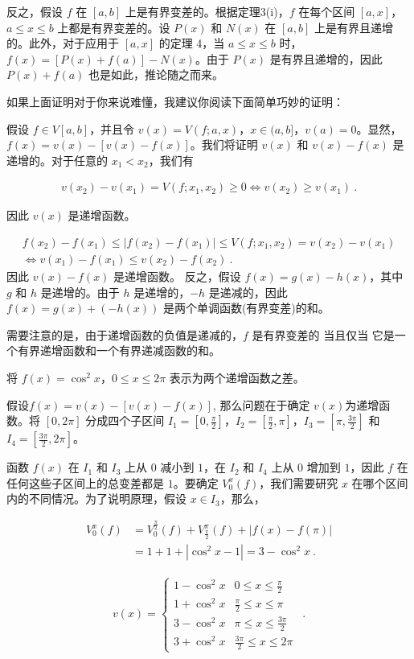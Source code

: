 反之，假设 $f$ 在 $[a,b]$ 上是有界变差的。根据定理3(i)，$f$ 在每个区间 $[a,x]$，$a\leq x\leq b$ 上都是有界变差的。设 $P(x)$ 和 $N(x)$ 在 $[a,b]$ 上是有界且递增的。此外，对于应用于 $[a,x]$ 的定理 4，当 $a\leq x\leq b$ 时，$f(x)=[P(x)+f(a)]-N(x)$。由于 $P(x)$ 是有界且递增的，因此 $P(x)+f(a)$ 也是如此，推论随之而来。

如果上面证明对于你来说难懂，我建议你阅读下面简单巧妙的证明：

假设 $f\in V[a,b]$，并且令 $v(x)=V(f;a,x)$，$x\in(a,b]$，$v(a)=0$。显然，$f(x)=v(x)-[v(x)-f(x)]$。我们将证明 $v(x)$ 和 $v(x)-f(x)$ 是递增的。对于任意的 $x_{1}<x_{2}$，我们有


\begin{align}
 v(x_{2})-v(x_{1})=V(f;x_1,x_2)\geq0\Leftrightarrow v(x_{2})\geq v(x_{1}) ~.
\end{align}

因此 $v(x)$ 是递增函数。

\begin{align}
f(x_{2})-f(x_{1})\leq|f(x_{2})-f(x_{1})|\leq V(f;x_1,x_2)=v(x_{2})-v(x_{1}) \\ \Leftrightarrow v(x_{1})-f(x_{1})\leq v(x_{2})-f(x_{2}) ~.
\end{align}
因此 $v(x)-f(x)$ 是递增函数。
反之，假设 $f(x)=g(x)-h(x)$，其中 $g$ 和 $h$ 是递增的。由于 $h$ 是递增的，$-h$ 是递减的，因此 $f(x)=g(x)+(-h(x))$ 是两个单调函数(有界变差)的和。

需要注意的是，由于递增函数的负值是递减的，$f$ 是有界变差的 当且仅当 它是一个有界递增函数和一个有界递减函数的和。

\begin{example}{将 $f(x)=\cos^{2}x$，$0\leq x\leq2\pi$ 表示为两个递增函数之差。}

假设$f(x) = v(x) - [v(x)-f(x)]$, 那么问题在于确定 $v(x)$为递增函数。将 $[0,2\pi]$ 分成四个子区间 $I_{1}=[0,\frac{\pi}{2}]$，$I_{2}=[\frac{\pi}{2},\pi]$，$I_{3}=[\pi,\frac{3\pi}{2}]$ 和 $I_{4}=[\frac{3\pi}{2},2\pi]$。

函数 $f(x)$ 在 $I_{1}$ 和 $I_{3}$ 上从 $0$ 减小到 $1$，在 $I_{2}$ 和 $I_{4}$ 上从 $0$ 增加到 $1$，因此 $f$ 在任何这些子区间上的总变差都是 $1$。要确定 $V_{0}^{x}(f)$，我们需要研究 $x$ 在哪个区间内的不同情况。为了说明原理，假设 $x\in I_{3}$，那么，

\begin{align}
V_{0}^{x}(f)&=V_{0}^{\frac{\pi}{2}}(f)+V_{\frac{\pi}{2}}^{\pi}(f)+|f(x)-f(\pi)| \\ &=1+1+|\cos^{2}x-1|=3-\cos^{2}x ~.
\end{align}


\begin{align}
 v(x)=\left\{\begin{array}{ll}1-\cos^2x&0\leq x\leq\frac{\pi}{2}\\ 1+\cos^2x&\frac{\pi}{2}\leq x\leq\pi\\ 3-\cos^2x&\pi\leq x\leq\frac{3\pi}{2}\\ 3+\cos^2x&\frac{3\pi}{2}\leq x\leq2\pi\end{array}\right. \ ~. 
\end{align}


\end{example}